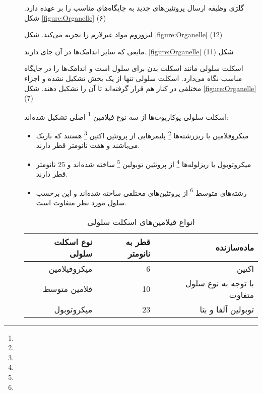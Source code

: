 \begin{description}
\item[]
گلژی وظیفه ارسال پروتئین‌های جدید به جایگاه‌های مناسب را بر عهده دارد.
شکل
\ref{figure:Organelle}
(۶)
\item[]
لیزوزوم مواد غیرلازم را تجزیه می‌کند.
شکل
\ref{figure:Organelle}
(12)
\item[]
مایعی که سایر اندامک‌ها در آن جای دارند.
\ref{figure:Organelle}
شکل
(11)
\item[]
اسکلت سلولی مانند اسکلت بدن برای سلول است و اندامک‌ها را در جایگاه مناسب نگاه می‌دارد. اسکلت سلولی تنها از یک بخش تشکیل نشده و اجزاء مختلفی در کنار هم قرار گرفته‌اند تا آن را تشکیل دهند.
شکل
\ref{figure:Organelle}
(7)

اسکلت سلولی یوکاریوت‌ها از سه نوع فیلامین
\footnote{}
اصلی تشکیل شده‌اند:

\begin{itemize}
\item
میکروفلامین یا ریزرشته‌ها
\footnote{}
 پلیمر‌هایی از پروتئین اکتین
\footnote{}
هستند که باریک می‌باشند و هفت نانومتر قطر دارند.
\item
میکروتوبول یا ریزلوله‌ها
\footnote{}
 از پروتئین توبولین
\footnote{}
ساخته شده‌اند و 25 نانومتر قطر دارند.
\item
رشته‌های متوسط
\footnote{}
 از پروتئین‌های مختلفی ساخته شده‌اند و این برحسب سلول مورد نظر متفاوت است.
\end{itemize}

\begin{figure}[h]
	\centering
	\qquad
\end{figure}

\begin{table}[h]
	\centering
	\begin{tabular}{|r|r|r|}
\hline
نوع اسکلت سلولی & قطر به نانومتر & ماده‌سازنده \\
\hline
میکروفیلامین & 6 & اکتین\\
فلامین متوسط & 10 & با توجه به  نوع سلول متفاوت \\
	میکروتوبول‌ & 23 & توبولین آلفا و بتا\\
\hline
	\end{tabular}
	\caption{انواع فیلامین‌های اسکلت سلولی}
\end{table}


\end{description}
